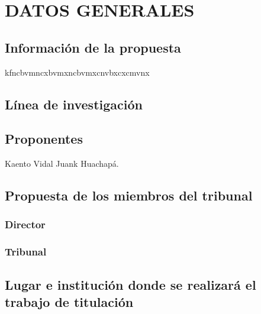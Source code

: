 \chapter{DATOS GENERALES}

\section{Información de la propuesta}
kfncbvmncxbvmxncbvmxcnvbxcxcmvnx

\section{Línea de investigación}

\section{Proponentes}
\noindent Kaento Vidal Juank Huachapá.

\section{Propuesta de los miembros del tribunal}

\subsection{Director}

\subsection{Tribunal}

\section{Lugar e institución donde se realizará el trabajo de titulación}




